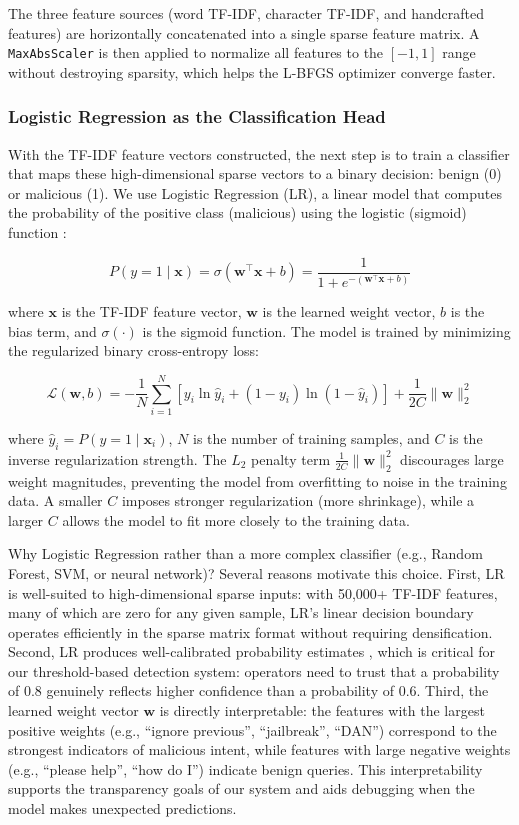 \documentclass[12pt, letterpaper]{article}   %
\begin{document}
The three feature sources (word TF-IDF, character TF-IDF, and handcrafted features) are horizontally concatenated into a single sparse feature matrix. A \texttt{MaxAbsScaler} is then applied to normalize all features to the $[-1, 1]$ range without destroying sparsity, which helps the L-BFGS optimizer converge faster.

\subsubsection{Logistic Regression as the Classification Head}

With the TF-IDF feature vectors constructed, the next step is to train a classifier that maps these high-dimensional sparse vectors to a binary decision: benign (0) or malicious (1). We use Logistic Regression (LR), a linear model that computes the probability of the positive class (malicious) using the logistic (sigmoid) function \cite{ref33}\cite{ref1}:

\[
    P(y = 1 \mid \mathbf{x}) = \sigma(\mathbf{w}^\top \mathbf{x} + b) = \frac{1}{1 + e^{-(\mathbf{w}^\top \mathbf{x} + b)}}
\]

where $\mathbf{x}$ is the TF-IDF feature vector, $\mathbf{w}$ is the learned weight vector, $b$ is the bias term, and $\sigma(\cdot)$ is the sigmoid function. The model is trained by minimizing the regularized binary cross-entropy loss:

\[
    \mathcal{L}(\mathbf{w}, b) = -\frac{1}{N} \sum_{i=1}^{N} \left[ y_i \ln \hat{y}_i + (1 - y_i) \ln(1 - \hat{y}_i) \right] + \frac{1}{2C} \|\mathbf{w}\|_2^2
\]

where $\hat{y}_i = P(y = 1 \mid \mathbf{x}_i)$, $N$ is the number of training samples, and $C$ is the inverse regularization strength. The $L_2$ penalty term $\frac{1}{2C}\|\mathbf{w}\|_2^2$ discourages large weight magnitudes, preventing the model from overfitting to noise in the training data. A smaller $C$ imposes stronger regularization (more shrinkage), while a larger $C$ allows the model to fit more closely to the training data.

Why Logistic Regression rather than a more complex classifier (e.g., Random Forest, SVM, or neural network)? Several reasons motivate this choice. First, LR is well-suited to high-dimensional sparse inputs: with 50,000+ TF-IDF features, many of which are zero for any given sample, LR's linear decision boundary operates efficiently in the sparse matrix format without requiring densification. Second, LR produces well-calibrated probability estimates \cite{ref33}, which is critical for our threshold-based detection system: operators need to trust that a probability of 0.8 genuinely reflects higher confidence than a probability of 0.6. Third, the learned weight vector $\mathbf{w}$ is directly interpretable: the features with the largest positive weights (e.g., ``ignore previous'', ``jailbreak'', ``DAN'') correspond to the strongest indicators of malicious intent, while features with large negative weights (e.g., ``please help'', ``how do I'') indicate benign queries. This interpretability supports the transparency goals of our system and aids debugging when the model makes unexpected predictions.
\end{document}

